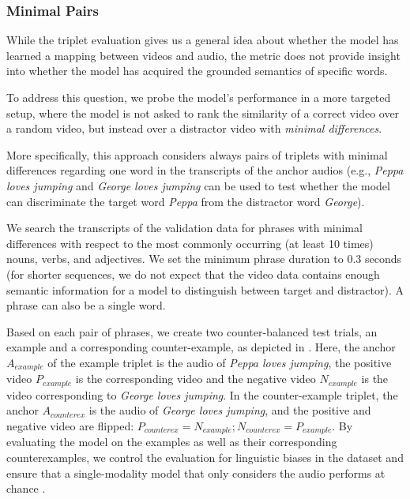 \subsubsection{Minimal Pairs}
\label{sec:targeted}
While the triplet evaluation gives us a general idea about whether the model 
has learned a mapping between videos and audio, the metric does not provide 
insight into whether the model has acquired the grounded semantics of specific 
words.

To address this question, we probe the model's performance in a more targeted 
setup, where the model is not asked to rank the similarity of a correct video 
over a random video, but instead over a distractor video with \textit{minimal 
differences}.

More specifically, this approach considers always pairs of 
triplets with minimal differences regarding one word in the transcripts of
the anchor audios (e.g., \textit{Peppa loves jumping} and
\textit{George loves jumping} can be used to test whether the model
can discriminate the target word \textit{Peppa} from the distractor
word \textit{George}).

We search the transcripts of the validation data for phrases with
minimal differences with respect to the most commonly occurring (at least 10 
times) nouns, verbs, and adjectives. We set the minimum phrase duration to 0.3 
seconds (for shorter sequences, we do not expect that the video data contains 
enough semantic information for a model to distinguish between target and 
distractor). A phrase can also be a single word.


Based on each pair of phrases, we create two counter-balanced test trials, an 
example and a corresponding counter-example, as depicted in
. Here, 
the anchor $A_{example}$ of the example
triplet is the audio of \textit{Peppa loves jumping}, the
positive video $P_{example}$ is the corresponding video and the
negative video $N_{example}$ is the video corresponding to \textit{George
  loves jumping}. In the
counter-example triplet, the anchor $A_{counterex}$ is the audio of
\textit{George loves jumping}, and the positive and negative video are
flipped: $P_{counterex} = N_{example}; N_{counterex} = P_{example}$. By 
evaluating the model on the examples as well as their corresponding 
counterexamples, we control the evaluation for linguistic biases in the dataset 
and ensure that a single-modality model that only considers the audio performs 
at chance \citep[see also][]{nikolaus-fourtassi-2021-evaluating}.


